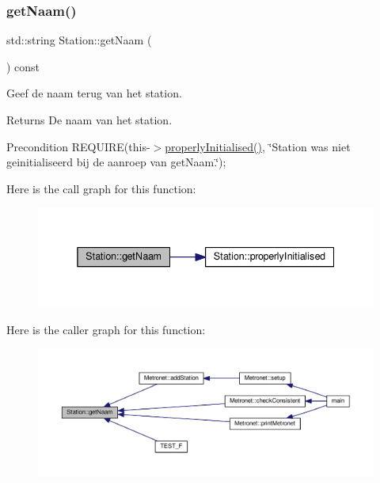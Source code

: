 \subsubsection{\texorpdfstring{get\+Naam()}{getNaam()}}
{\footnotesize\ttfamily std\+::string Station\+::get\+Naam (\begin{DoxyParamCaption}{ }\end{DoxyParamCaption}) const}



Geef de naam terug van het station. 

\begin{DoxyReturn}{Returns}
De naam van het station. 
\end{DoxyReturn}
\begin{DoxyPrecond}{Precondition}
R\+E\+Q\+U\+I\+RE(this-\/$>$\hyperlink{class_station_a9ce626dd0599e3ea8107404a59c21e16}{properly\+Initialised()}, \char`\"{}\+Station was niet geinitialiseerd bij de aanroep van get\+Naam.\char`\"{}); 
\end{DoxyPrecond}
Here is the call graph for this function\+:\nopagebreak
\begin{figure}[H]
\begin{center}
\leavevmode
\includegraphics[width=338pt]{class_station_aea6c31c39a5e1eb4c30337e7ce489e69_cgraph}
\end{center}
\end{figure}
Here is the caller graph for this function\+:\nopagebreak
\begin{figure}[H]
\begin{center}
\leavevmode
\includegraphics[width=350pt]{class_station_aea6c31c39a5e1eb4c30337e7ce489e69_icgraph}
\end{center}
\end{figure}
\mbox{\label{class_station_a5897f83319093d502f01f18b24678aba}} 
